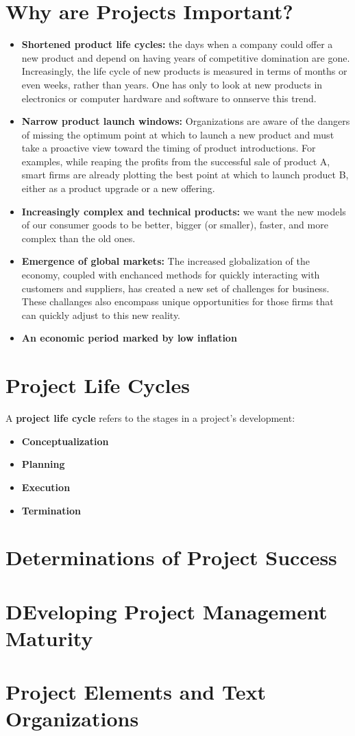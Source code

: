\section{Why are Projects Important?}
	\begin{itemize}
		\item {\bf Shortened product life cycles:} the days when a company could offer a 
		new product and depend on having years of competitive domination are gone.
		Increasingly, the life cycle of new products is measured in terms of months or
		even weeks, rather than years. One has only to look at new products in electronics
		or computer hardware and software to onnserve this trend. 
		\item {\bf Narrow product launch windows:} Organizations are aware of the dangers
		of missing the optimum point at which to launch a new product and must take a proactive
		view toward the timing of product introductions. For examples, while reaping the profits
		from the successful sale of product A, smart firms are already plotting the best
		point at which to launch product B, either as a product upgrade or a new offering.
		\item {\bf Increasingly complex and technical products:} we want the new models of
		our consumer goods to be better, bigger (or smaller), faster, and more complex than 
		the old ones. 
		\item {\bf Emergence of global markets:} The increased globalization of the economy,
		coupled with enchanced methods for quickly interacting with customers and suppliers,
		has created a new set of challenges for business. These challanges also encompass
		unique opportunities for those firms that can quickly adjust to this new reality.
		\item {\bf An economic period marked by low inflation}
	\end{itemize}

\section{Project Life Cycles}

	A {\bf project life cycle} refers to the stages in a project's development:
	\begin{itemize}
		\item {\bf Conceptualization}
		\item {\bf Planning}
		\item {\bf Execution}
		\item {\bf Termination}
	\end{itemize}

\section{Determinations of Project Success}

\section{DEveloping Project Management Maturity}

\section{Project Elements and Text Organizations}

